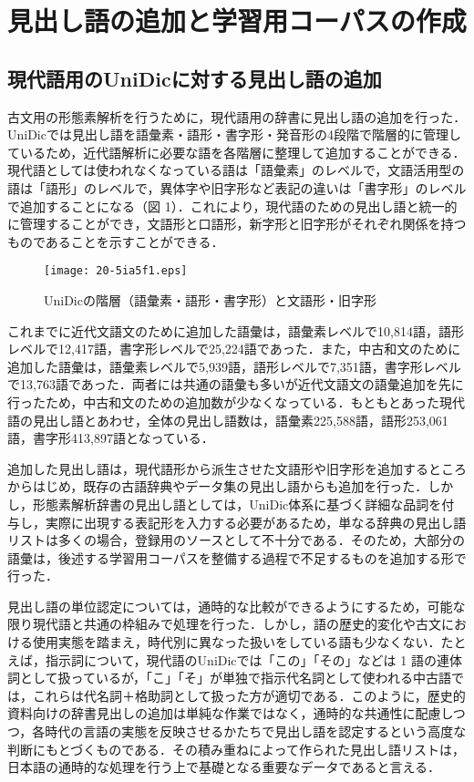 \documentclass[japanese]{jnlp_1.4}
\begin{document}
\section{見出し語の追加と学習用コーパスの作成}

\subsection{現代語用のUniDicに対する見出し語の追加}

古文用の形態素解析を行うために，現代語用の辞書に見出し語の追加を行った．UniDicでは見出し語を語彙素・語形・書字形・発音形の4段階で階層的に管理しているため，近代語解析に必要な語を各階層に整理して追加することができる．現代語としては使われなくなっている語は「語彙素」のレベルで，文語活用型の語は「語形」のレベルで，異体字や旧字形など表記の違いは「書字形」のレベルで追加することになる（図 1）．これにより，現代語のための見出し語と統一的に管理することができ，文語形と口語形，新字形と旧字形がそれぞれ関係を持つものであることを示すことができる．

\begin{figure}[t]
\begin{center}
\texttt{[image: 20-5ia5f1.eps]}
\end{center}
\caption{UniDicの階層（語彙素・語形・書字形）と文語形・旧字形}
\label{fig1}
\vspace{-1\Cvs}
\end{figure}

これまでに近代文語文のために追加した語彙は，語彙素レベルで10,814語，語形レベルで12,417語，書字形レベルで25,224語であった．また，中古和文のために追加した語彙は，語彙素レベルで5,939語，語形レベルで7,351語，書字形レベルで13,763語であった．両者には共通の語彙も多いが近代文語文の語彙追加を先に行ったため，中古和文のための追加数が少なくなっている．もともとあった現代語の見出し語とあわせ，全体の見出し語数は，語彙素225,588語，語形253,061語，書字形413,897語となっている．

追加した見出し語は，現代語形から派生させた文語形や旧字形を追加するところからはじめ，既存の古語辞典やデータ集の見出し語からも追加を行った．しかし，形態素解析辞書の見出し語としては，UniDic体系に基づく詳細な品詞を付与し，実際に出現する表記形を入力する必要があるため，単なる辞典の見出し語リストは多くの場合，登録用のソースとして不十分である．そのため，大部分の語彙は，後述する学習用コーパスを整備する過程で不足するものを追加する形で行った．

見出し語の単位認定については，通時的な比較ができるようにするため，可能な限り現代語と共通の枠組みで処理を行った．しかし，語の歴史的変化や古文における使用実態を踏まえ，時代別に異なった扱いをしている語も少なくない．たとえば，指示詞について，現代語のUniDicでは「この」「その」などは 1 語の連体詞として扱っているが，「こ」「そ」が単独で指示代名詞として使われる中古語では，これらは代名詞＋格助詞として扱った方が適切である．このように，歴史的資料向けの辞書見出しの追加は単純な作業ではなく，通時的な共通性に配慮しつつ，各時代の言語の実態を反映させるかたちで見出し語を認定するという高度な判断にもとづくものである．その積み重ねによって作られた見出し語リストは，日本語の通時的な処理を行う上で基礎となる重要なデータであると言える．
\end{document}
